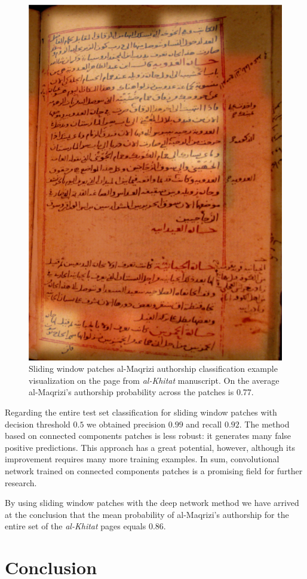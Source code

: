 \documentclass[conference,a4paper]{ieeetran}
\begin{document}
\begin{figure}[!t]
	\centering
  \includegraphics[width=0.49\linewidth]{figures/hitat_15_fixed.png}
   \caption{Sliding window patches al-Maqrizi authorship classification example visualization on the page from {\it al-Khitat} manuscript. On the average al-Maqrizi's authorship probability across the patches is 0.77.}
	\label{fig:al_maqrizi_classification_example_test_hitat}
\end{figure}

Regarding the entire test set classification for sliding window patches with decision threshold $0.5$ we obtained precision $0.99$ and recall $0.92$. The method based on connected components patches is less robust: it generates many false positive predictions. This approach has a great potential, however, although its improvement requires many more training examples. In sum, convolutional network trained on connected components patches is a promising field for further research.

By using sliding window patches with the deep network method we have arrived at the conclusion that the mean probability of al-Maqrizi's authorship for the entire set of the {\it al-Khitat} pages equals $0.86$.    

\section{Conclusion}
\end{document}
